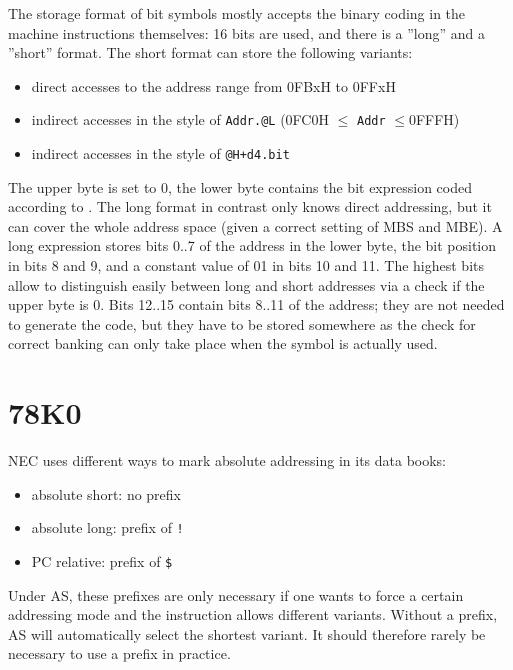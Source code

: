 \documentclass[12pt,twoside]{report}
\newcommand{\tty}[1]{{\tt #1}}
\newcommand{\asname}{{AS}}
\begin{document}
The storage format of bit symbols mostly accepts the binary coding in
the machine instructions themselves:  16 bits are used, and there is
a ''long'' and a ''short'' format.  The short format can store the
following variants:
\begin{itemize}
\item{direct accesses to the address range from 0FBxH to 0FFxH}
\item{indirect accesses in the style of \tty{Addr.@L} (0FC0H $\leq$ \tty{Addr} $\leq$0FFFH)}
\item{indirect accesses in the style of \tty{@H+d4.bit}}
\end{itemize}
The upper byte is set to 0, the lower byte contains the bit
expression coded according to \cite{NEC75}.  The long format in contrast
only knows direct addressing, but it can cover the whole address space
(given a correct setting of MBS and MBE).  A long expression stores
bits 0..7 of the address in the lower byte, the bit position in bits
8 and 9, and a constant value of 01 in bits 10 and 11.  The highest
bits allow to distinguish easily between long and short addresses via
a check if the upper byte is 0.  Bits 12..15 contain bits 8..11 of
the address; they are not needed to generate the code, but they have
to be stored somewhere as the check for correct banking can only
take place when the symbol is actually used.


\section{78K0}
\label{78K0Spec}

NEC uses different ways to mark absolute addressing in its data
books:
\begin{itemize}
\item{absolute short: no prefix}
\item{absolute long: prefix of \tty{!}}
\item{PC relative: prefix of \tty{\$}}
\end{itemize}
Under \asname{}, these prefixes are only necessary if one wants to force a
certain addressing mode and the instruction allows different
variants.  Without a prefix, \asname{} will automatically select the shortest
variant.  It should therefore rarely be necessary to use a prefix in
practice.

\end{document}
